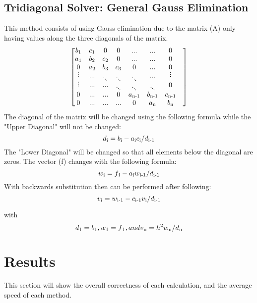 \documentclass[12pt]{article}
\begin{document}
\subsection{Tridiagonal Solver: General Gauss Elimination}
This method consists of using Gauss elimination due to the matrix (A) only having values along the three diagonals of the matrix.\\
$$
\begin{bmatrix}
b\textsubscript{1}& c\textsubscript{1}& 0& 0& ...& ...& 0&\\
a\textsubscript{1}& b\textsubscript{2}&  c\textsubscript{2}& 0& ...& ...& 0&\\
0& a\textsubscript{2}& b\textsubscript{3}&  c\textsubscript{3}& 0& ...& 0&\\
\rotatebox{90}{...}& ...& \rotatebox{320}{...}& \rotatebox{320}{...}& \rotatebox{320}{...}& ...& \rotatebox{90}{...}&\\
\rotatebox{90}{...}& ...& ...& \rotatebox{320}{...}& \rotatebox{320}{...}& \rotatebox{320}{...}& 0&\\
0& ...& ...& 0& a\textsubscript{n-1}& b\textsubscript{n-1}& c\textsubscript{n-1}&\\
0& ...& ...& ...& 0& a\textsubscript{n}& b\textsubscript{n}&
\end{bmatrix}
$$
The diagonal of the matrix will be changed using the following formula while the "Upper Diagonal" will not be changed:\\
$$d\textsubscript{i} = b\textsubscript{i} - a\textsubscript{i}c\textsubscript{i} / d\textsubscript{i-1}\\$$
The "Lower Diagonal" will be changed so that all elements below the diagonal are zeros. The vector (f) changes with the following formula:\\
$$w\textsubscript{i} = f\textsubscript{i} - a\textsubscript{i}w\textsubscript{i-1} / d\textsubscript{i-1}\\$$
With backwards substitution then can be performed after following:\\
$$v\textsubscript{i} = w\textsubscript{i-1} - c\textsubscript{i-1}v\textsubscript{i} / d\textsubscript{i-1}\\$$
\begin{centering} with $$d\textsubscript{1} = b\textsubscript{1}, w\textsubscript{1} = f \textsubscript{1}, and v\textsubscript{n} = h\textsuperscript{2}w\textsubscript{n} / d\textsubscript{n}$$
\end{centering}

\section{Results}
This section will show the overall correctness of each calculation, and the average speed of each method.
\end{document}
